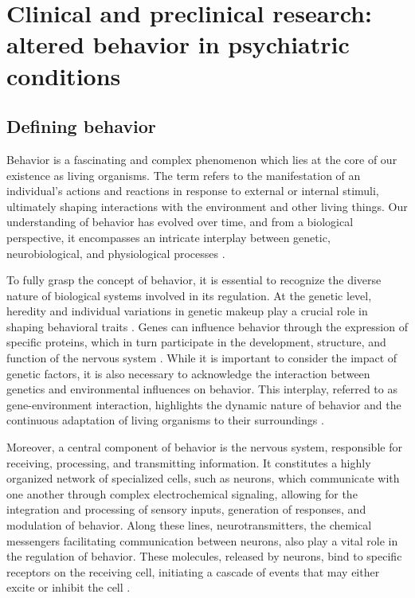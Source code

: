 \section{Clinical and preclinical research: altered behavior in psychiatric conditions}

\subsection{Defining behavior}

Behavior is a fascinating and complex phenomenon which lies at the core of our existence as living organisms. The term refers to the manifestation of an individual's actions and reactions in response to external or internal stimuli, ultimately shaping interactions with the environment and other living things. Our understanding of behavior has evolved over time, and from a biological perspective, it encompasses an intricate interplay between genetic, neurobiological, and physiological processes \cite{Levitis2009BehaviouralBehaviour}.

To fully grasp the concept of behavior, it is essential to recognize the diverse nature of biological systems involved in its regulation. At the genetic level, heredity and individual variations in genetic makeup play a crucial role in shaping behavioral traits \cite{Charney2017GenesGenetics}. Genes can influence behavior through the expression of specific proteins, which in turn participate in the development, structure, and function of the nervous system \cite{Zhou2021Gene-EnvironmentPerspective}. While it is important to consider the impact of genetic factors, it is also necessary to acknowledge the interaction between genetics and environmental influences on behavior. This interplay, referred to as gene-environment interaction, highlights the dynamic nature of behavior and the continuous adaptation of living organisms to their surroundings \cite{Cuevas2019NeurotransmittersCycle}.

Moreover, a central component of behavior is the nervous system, responsible for receiving, processing, and transmitting information. It constitutes a highly organized network of specialized cells, such as neurons, which communicate with one another through complex electrochemical signaling, allowing for the integration and processing of sensory inputs, generation of responses, and modulation of behavior. Along these lines, neurotransmitters, the chemical messengers facilitating communication between neurons, also play a vital role in the regulation of behavior. These molecules, released by neurons, bind to specific receptors on the receiving cell, initiating a cascade of events that may either excite or inhibit the cell \cite{Luo2020PrinciplesNeurobiology}. 


